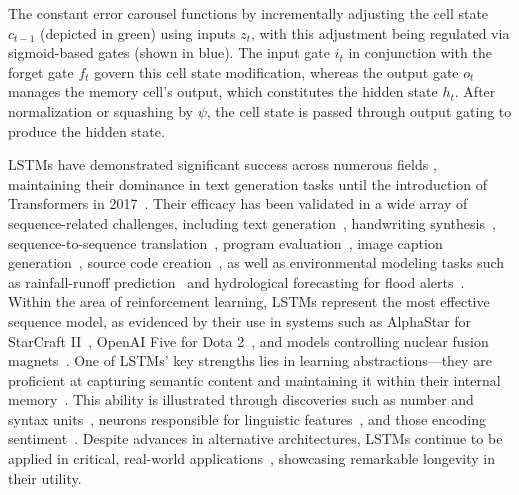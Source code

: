 The constant error carousel functions by incrementally adjusting the cell state $c_{t-1}$ (depicted in green) using inputs $z_t$, with this adjustment being regulated via sigmoid-based gates (shown in blue). The input gate $i_t$ in conjunction with the forget gate $f_t$ govern this cell state modification, whereas the output gate $o_t$ manages the memory cell’s output, which constitutes the hidden state $h_t$. After normalization or squashing by $\psi$, the cell state is passed through output gating to produce the hidden state.

LSTMs have demonstrated significant success across numerous fields \citep{Hochreiter:01,Hochreiter:07,Schmidhuber:15}, maintaining their dominance in text generation tasks until the introduction of Transformers in 2017~\citep{Vaswani:17}. Their efficacy has been validated in a wide array of sequence-related challenges, including text generation~\citep{Graves:13,Karpathy:15blog}, handwriting synthesis~\citep{Graves:13}, sequence-to-sequence translation~\citep{Sutskever:14nips}, program evaluation~\citep{Zaremba:14arxiv}, image caption generation~\citep{Karpathy:15,Hossain:19}, source code creation~\citep{Karpathy:15blog}, as well as environmental modeling tasks such as rainfall-runoff prediction~\citep{Kratzert:18,Kratzert:19} and hydrological forecasting for flood alerts~\citep{Nearing:24}. Within the area of reinforcement learning, LSTMs represent the most effective sequence model, as evidenced by their use in systems such as AlphaStar for StarCraft II~\citep{Vinyals:17short}, OpenAI Five for Dota 2~\citep{OpenAI:19}, and models controlling nuclear fusion magnets~\citep{Degrave:22short}. One of LSTMs’ key strengths lies in learning abstractions—they are proficient at capturing semantic content and maintaining it within their internal memory~\citep{Karpathy:15blog}. This ability is illustrated through discoveries such as number and syntax units~\citep{Lakretz:19}, neurons responsible for linguistic features~\citep{Bau:19}, and those encoding sentiment~\citep{Radford:17arxiv}. Despite advances in alternative architectures, LSTMs continue to be applied in critical, real-world applications~\citep{Degrave:22short,Nearing:24}, showcasing remarkable longevity in their utility.

